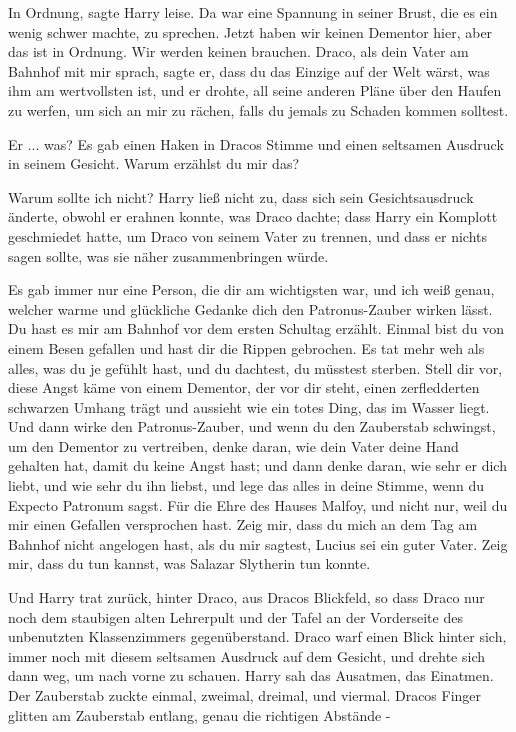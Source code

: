 \glqq{}In Ordnung\grqq{}, sagte Harry leise. Da war eine Spannung in seiner
Brust, die es ein wenig schwer machte, zu sprechen. \glqq{}Jetzt haben wir keinen
Dementor hier, aber das ist in Ordnung. Wir werden keinen brauchen. Draco, als
dein Vater am Bahnhof mit mir sprach, sagte er, dass du das Einzige auf der Welt
wärst, was ihm am wertvollsten ist, und er drohte, all seine anderen Pläne über
den Haufen zu werfen, um sich an mir zu rächen, falls du jemals zu Schaden
kommen solltest.\grqq{}

\glqq{}Er ... was?\grqq{} Es gab einen Haken in Dracos Stimme und einen seltsamen
Ausdruck in seinem Gesicht. \glqq{}Warum erzählst du mir das?\grqq{}

\glqq{}Warum sollte ich nicht?\grqq{} Harry ließ nicht zu, dass sich sein
Gesichtsausdruck änderte, obwohl er erahnen konnte, was Draco dachte; dass Harry
ein Komplott geschmiedet hatte, um Draco von seinem Vater zu trennen, und dass
er nichts sagen sollte, was sie näher zusammenbringen würde.

\glqq{}Es gab immer nur eine Person, die dir am wichtigsten war, und ich weiß
genau, welcher warme und glückliche Gedanke dich den Patronus-Zauber wirken
lässt. Du hast es mir am Bahnhof vor dem ersten Schultag erzählt. Einmal bist du
von einem Besen gefallen und hast dir die Rippen gebrochen. Es tat mehr weh als
alles, was du je gefühlt hast, und du dachtest, du müsstest sterben. Stell dir
vor, diese Angst käme von einem Dementor, der vor dir steht, einen zerfledderten
schwarzen Umhang trägt und aussieht wie ein totes Ding, das im Wasser liegt. Und
dann wirke den Patronus-Zauber, und wenn du den Zauberstab schwingst, um den
Dementor zu vertreiben, denke daran, wie dein Vater deine Hand gehalten hat,
damit du keine Angst hast; und dann denke daran, wie sehr er dich liebt, und wie
sehr du ihn liebst, und lege das alles in deine Stimme, wenn du Expecto Patronum
sagst. Für die Ehre des Hauses Malfoy, und nicht nur, weil du mir einen Gefallen
versprochen hast. Zeig mir, dass du mich an dem Tag am Bahnhof nicht angelogen
hast, als du mir sagtest, Lucius sei ein guter Vater. Zeig mir, dass du tun
kannst, was Salazar Slytherin tun konnte.\grqq{}

Und Harry trat zurück, hinter Draco, aus Dracos Blickfeld, so dass Draco nur
noch dem staubigen alten Lehrerpult und der Tafel an der Vorderseite des
unbenutzten Klassenzimmers gegenüberstand. Draco warf einen Blick hinter sich,
immer noch mit diesem seltsamen Ausdruck auf dem Gesicht, und drehte sich dann
weg, um nach vorne zu schauen. Harry sah das Ausatmen, das Einatmen. Der
Zauberstab zuckte einmal, zweimal, dreimal, und viermal. Dracos Finger glitten
am Zauberstab entlang, genau die richtigen Abstände -

